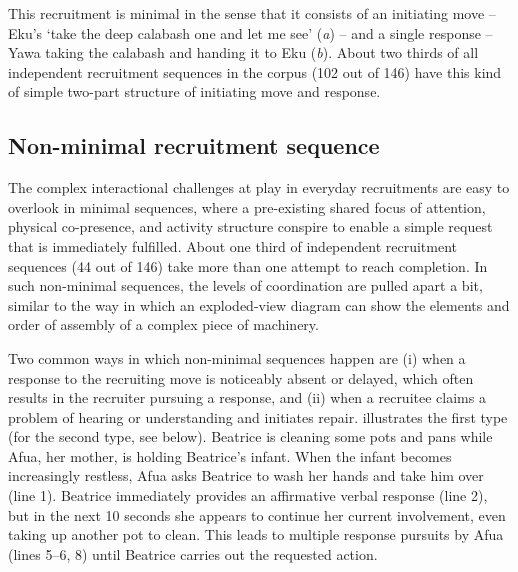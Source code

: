 \documentclass[output=paper]{langsci/langscibook}
\begin{document}
This recruitment is minimal in the sense that it consists of an initiating move -- Eku’s ‘take the deep calabash one and let me see’ (\textit{a}) -- and a single response -- Yawa taking the calabash and handing it to Eku (\textit{b}). About two thirds of all independent recruitment sequences in the corpus (102 out of 146) have this kind of simple two-part structure of initiating move and response.

\subsection{Non-minimal recruitment sequence}

The complex interactional challenges at play in everyday recruitments are easy to overlook in minimal sequences, where a pre-existing shared focus of attention, physical co-presence, and activity structure conspire to enable a simple request that is immediately fulfilled. About one third of independent recruitment sequences (44 out of 146) take more than one attempt to reach completion. In such non-minimal sequences, the levels of coordination are pulled apart a bit, similar to the way in which an exploded-view diagram can show the elements and order of assembly of a complex piece of machinery.

Two common ways in which non-minimal sequences happen are
(i) when a response to the recruiting move is noticeably absent or delayed, which often results in the recruiter pursuing a response, and (ii) when a recruitee claims a problem of hearing or understanding and initiates repair.  illustrates the first type (for the second type, see  below). Beatrice is cleaning some pots and pans while Afua, her mother, is holding Beatrice’s infant. When the infant becomes increasingly restless, Afua asks Beatrice to wash her hands and take him over (line 1). Beatrice immediately provides an affirmative verbal response (line 2), but in the next 10 seconds she appears to continue her current involvement, even taking up another pot to clean. This leads to multiple response pursuits by Afua (lines 5--6, 8) until Beatrice carries out the requested action.
\end{document}
